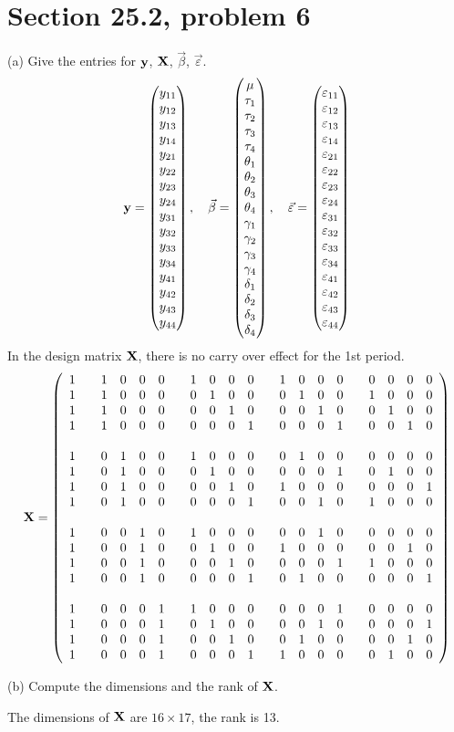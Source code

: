 \section{Section 25.2, problem 6}
(a) Give the entries for $\bf y$, $\bf X$, $\vec\beta$, $\vec\varepsilon$.
$${\bf y}=\left(\begin{matrix}
y_{11}\cr
y_{12}\cr
y_{13}\cr
y_{14}\cr
y_{21}\cr
y_{22}\cr
y_{23}\cr
y_{24}\cr
y_{31}\cr
y_{32}\cr
y_{33}\cr
y_{34}\cr
y_{41}\cr
y_{42}\cr
y_{43}\cr
y_{44}
\end{matrix}\right),\quad\vec\beta=\left(\begin{matrix}
\mu\cr
\tau_1\cr
\tau_2\cr
\tau_3\cr
\tau_4\cr
\theta_1\cr
\theta_2\cr
\theta_3\cr
\theta_4\cr
\gamma_1\cr
\gamma_2\cr
\gamma_3\cr
\gamma_4\cr
\delta_1\cr
\delta_2\cr
\delta_3\cr
\delta_4
\end{matrix}\right),\quad\vec\varepsilon=\left(\begin{matrix}
\varepsilon_{11}\cr
\varepsilon_{12}\cr
\varepsilon_{13}\cr
\varepsilon_{14}\cr
\varepsilon_{21}\cr
\varepsilon_{22}\cr
\varepsilon_{23}\cr
\varepsilon_{24}\cr
\varepsilon_{31}\cr
\varepsilon_{32}\cr
\varepsilon_{33}\cr
\varepsilon_{34}\cr
\varepsilon_{41}\cr
\varepsilon_{42}\cr
\varepsilon_{43}\cr
\varepsilon_{44}
\end{matrix}\right)
$$
In the design matrix $\bf X$, there is no carry over effect for the 1st period.
$${\bf X}=\left(\begin{array}{ccccccccccccccccccccc}
1 && 1 & 0 & 0 & 0 && 1 & 0 & 0 & 0 && 1 & 0 & 0 & 0 && 0 & 0 & 0 & 0\cr
1 && 1 & 0 & 0 & 0 && 0 & 1 & 0 & 0 && 0 & 1 & 0 & 0 && 1 & 0 & 0 & 0\cr
1 && 1 & 0 & 0 & 0 && 0 & 0 & 1 & 0 && 0 & 0 & 1 & 0 && 0 & 1 & 0 & 0\cr
1 && 1 & 0 & 0 & 0 && 0 & 0 & 0 & 1 && 0 & 0 & 0 & 1 && 0 & 0 & 1 & 0\cr
\cr
1 && 0 & 1 & 0 & 0 && 1 & 0 & 0 & 0 && 0 & 1 & 0 & 0 && 0 & 0 & 0 & 0\cr
1 && 0 & 1 & 0 & 0 && 0 & 1 & 0 & 0 && 0 & 0 & 0 & 1 && 0 & 1 & 0 & 0\cr
1 && 0 & 1 & 0 & 0 && 0 & 0 & 1 & 0 && 1 & 0 & 0 & 0 && 0 & 0 & 0 & 1\cr
1 && 0 & 1 & 0 & 0 && 0 & 0 & 0 & 1 && 0 & 0 & 1 & 0 && 1 & 0 & 0 & 0\cr
\cr
1 && 0 & 0 & 1 & 0 && 1 & 0 & 0 & 0 && 0 & 0 & 1 & 0 && 0 & 0 & 0 & 0\cr
1 && 0 & 0 & 1 & 0 && 0 & 1 & 0 & 0 && 1 & 0 & 0 & 0 && 0 & 0 & 1 & 0\cr
1 && 0 & 0 & 1 & 0 && 0 & 0 & 1 & 0 && 0 & 0 & 0 & 1 && 1 & 0 & 0 & 0\cr
1 && 0 & 0 & 1 & 0 && 0 & 0 & 0 & 1 && 0 & 1 & 0 & 0 && 0 & 0 & 0 & 1\cr
\cr
1 && 0 & 0 & 0 & 1 && 1 & 0 & 0 & 0 && 0 & 0 & 0 & 1 && 0 & 0 & 0 & 0\cr
1 && 0 & 0 & 0 & 1 && 0 & 1 & 0 & 0 && 0 & 0 & 1 & 0 && 0 & 0 & 0 & 1\cr
1 && 0 & 0 & 0 & 1 && 0 & 0 & 1 & 0 && 0 & 1 & 0 & 0 && 0 & 0 & 1 & 0\cr
1 && 0 & 0 & 0 & 1 && 0 & 0 & 0 & 1 && 1 & 0 & 0 & 0 && 0 & 1 & 0 & 0\cr
\end{array}\right)
$$

\bigskip
\noindent
(b) Compute the dimensions and the rank of $\bf X$.

\bigskip
\noindent
The dimensions of $\bf X$ are $16\times 17$, the rank is 13.
